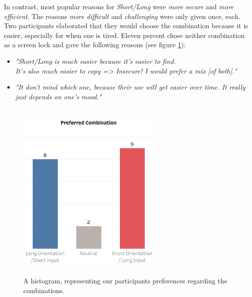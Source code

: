 In contrast, most popular reasons for \textit{Short/Long} were \textit{more secure} and \textit{more efficient}. The reasons \textit{more difficult} and \textit{challenging} were only given once, each. Two participants elaborated that they would choose the combination because it is easier, especially for when one is tired. Eleven percent chose neither combination as a screen lock and gave the following reasons (see figure \ref{fig:preference}): 
\begin{itemize}
    \item \textit{"Short/Long is much easier because it's easier to find.\\ It's also much easier to copy => Insecure! I would prefer a mix [of both]."}
    \item \textit{"It don't mind which one, because their use will get easier over time. It really just depends on one's mood."} 
\end{itemize}

\begin{figure}[t!]
\centering
\includegraphics[width=7cm, height=9cm]{Chapters/graphics/preference.png}
\caption{A histogram, representing our participants preferences regarding the combinations.}
\label{fig:preference}
\end{figure}

